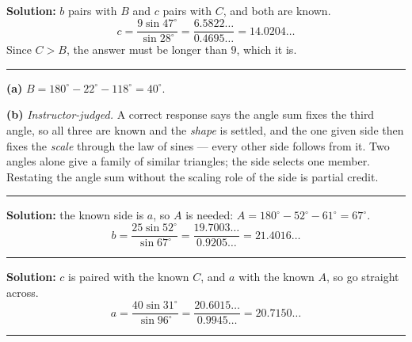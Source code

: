 \documentclass[12pt]{article}
\begin{document}
\textbf{Solution:} $b$ pairs with $B$ and $c$ pairs with $C$, and both are known.
\[ c = \frac{9\sin 47^\circ}{\sin 28^\circ} = \frac{6.5822\ldots}{0.4695\ldots} = 14.0204\ldots \]
Since $C > B$, the answer must be longer than $9$, which it is. 

\vspace{0.12cm}\noindent\rule{\linewidth}{0.2pt}\vspace{0.12cm}


\textbf{(a)} $B = 180^\circ - 22^\circ - 118^\circ = 40^\circ$. 

\textbf{(b)} \emph{Instructor-judged.} A correct response says the angle sum fixes the third angle, so all three are known and the \emph{shape} is settled, and the one given side then fixes the \emph{scale} through the law of sines --- every other side follows from it. Two angles alone give a family of similar triangles; the side selects one member. Restating the angle sum without the scaling role of the side is partial credit.

\vspace{0.12cm}\noindent\rule{\linewidth}{0.2pt}\vspace{0.12cm}


\textbf{Solution:} the known side is $a$, so $A$ is needed: $A = 180^\circ - 52^\circ - 61^\circ = 67^\circ$.
\[ b = \frac{25\sin 52^\circ}{\sin 67^\circ} = \frac{19.7003\ldots}{0.9205\ldots} = 21.4016\ldots \]

\vspace{0.12cm}\noindent\rule{\linewidth}{0.2pt}\vspace{0.12cm}


\textbf{Solution:} $c$ is paired with the known $C$, and $a$ with the known $A$, so go straight across.
\[ a = \frac{40\sin 31^\circ}{\sin 96^\circ} = \frac{20.6015\ldots}{0.9945\ldots} = 20.7150\ldots \]

\vspace{0.12cm}\noindent\rule{\linewidth}{0.2pt}\vspace{0.12cm}

\end{document}
